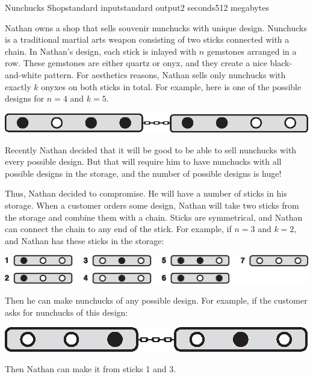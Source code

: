 \begin{problem}{Nunchucks Shop}{standard input}{standard output}{2 seconds}{512 megabytes}

Nathan owns a shop that sells souvenir nunchucks with unique design. Nunchucks is a traditional martial arts weapon consisting of two sticks connected with a chain. In Nathan's design, each stick is inlayed with $n$ gemstones arranged in a row. These gemstones are either quartz or onyx, and they create a nice black-and-white pattern. For aesthetics reasons, Nathan sells only nunchucks with exactly $k$ onyxes on both sticks in total. For example, here is one of the possible designs for $n=4$ and $k=5$.

\begin{center}
\includegraphics{pic1.eps}
\end{center}

Recently Nathan decided that it will be good to be able to sell nunchucks with every possible design. But that will require him to have nunchucks with all possible designs in the storage, and the number of possible designs is huge! 

Thus, Nathan decided to compromise. He will have a number of sticks in his storage. When a customer orders some design, Nathan will take two sticks from the storage and combine them with a chain. Sticks are symmetrical, and Nathan can connect the chain to any end of the stick. For example, if $n=3$ and $k=2$, and Nathan has these sticks in the storage:

\begin{center}
\includegraphics{pic2.eps}
\end{center}

Then he can make nunchucks of any possible design. For example, if the customer asks for nunchucks of this design:

\begin{center}
\includegraphics{pic3.eps}
\end{center}

Then Nathan can make it from sticks 1 and 3.


\end{problem}
